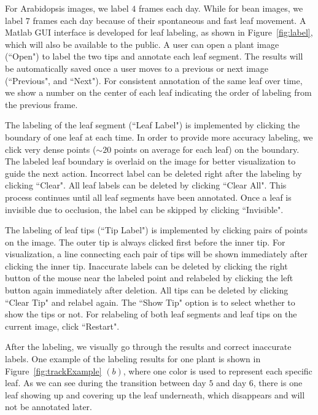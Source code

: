 For Arabidopsis images, we label $4$ frames each day.
While for bean images, we label $7$ frames each day because of their spontaneous and fast leaf movement.
A Matlab GUI interface is developed for leaf labeling, as shown in Figure~\ref{fig:label}, which will also be available to the public.
A user can open a plant image (``Open") to label the two tips and annotate each leaf segment.
The results will be automatically saved once a user moves to a previous or next image (``Previous", and ``Next").
For consistent annotation of the same leaf over time, we show a number on the center of each leaf indicating the order of labeling from the previous frame.

The labeling of the leaf segment (``Leaf Label") is implemented by clicking the boundary of one leaf at each time.
In order to provide more accuracy labeling, we click very dense points ($\sim20$ points on average for each leaf) on the boundary.
The labeled leaf boundary is overlaid on the image for better visualization to guide the next action.
Incorrect label can be deleted right after the labeling by clicking ``Clear".
All leaf labels can be deleted by clicking ``Clear All".
This process continues until all leaf segments have been annotated.
Once a leaf is invisible due to occlusion, the label can be skipped by clicking ``Invisible".

The labeling of leaf tips (``Tip Label") is implemented by clicking pairs of points on the image.
The outer tip is always clicked first before the inner tip.
For visualization, a line connecting each pair of tips will be shown immediately after clicking the inner tip.
Inaccurate labels can be deleted by clicking the right button of the mouse near the labeled point and relabeled by clicking the left button again immediately after deletion.
All tips can be deleted by clicking ``Clear Tip" and relabel again.
The ``Show Tip" option is to select whether to show the tips or not. 
For relabeling of both leaf segments and leaf tips on the current image, click ``Restart". 

After the labeling, we visually go through the results and correct inaccurate labels.
One example of the labeling results for one plant is shown in Figure~\ref{fig:trackExample} $(b)$, where one color is used to represent each specific leaf.
As we can see during the transition between day $5$ and day $6$, there is one leaf showing up and covering up the leaf underneath, which disappears and will not be annotated later.

